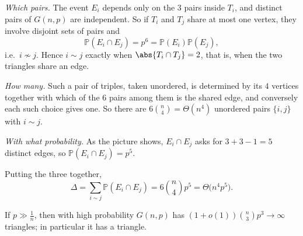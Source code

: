\emph{Which pairs.} The event \(E_i\) depends only on the \(3\) pairs inside \(T_i\), and distinct pairs of \(G(n,p)\) are independent. So if \(T_i\) and \(T_j\) share at most one vertex, they involve disjoint sets of pairs and
\[
    \mathbb{P}(E_i \cap E_j) = p^{6} = \mathbb{P}(E_i) \mathbb{P}(E_j),
\]
i.e.\ \(i \not\sim j\). Hence \(i \sim j\) exactly when \(\abs{T_i \cap T_j} = 2\), that is, when the two triangles share an edge.
\begin{center}
\end{center}

\emph{How many.} Such a pair of triples, taken unordered, is determined by its \(4\) vertices together with which of the \(6\) pairs among them is the shared edge, and conversely each such choice gives one. So there are \(6\binom{n}{4} = \Theta(n^{4})\) unordered pairs \(\{i,j\}\) with \(i \sim j\).

\emph{With what probability.} As the picture shows, \(E_i \cap E_j\) asks for \(3 + 3 - 1 = 5\) distinct edges, so \(\mathbb{P}(E_i \cap E_j) = p^{5}\).

Putting the three together,
\[
    \Delta = \sum_{i \sim j} \mathbb{P}(E_i \cap E_j) = 6\binom{n}{4} p^{5} = \Theta\bigl( n^{4} p^{5} \bigr).
\]

\begin{proposition}\label{prop:triangle-dense}
    If \(p \gg \frac{1}{n}\), then with high probability \(G(n,p)\) has \((1+o(1)) \binom{n}{3}p^{3} \to \infty\) triangles; in particular it has a triangle.
\end{proposition}

